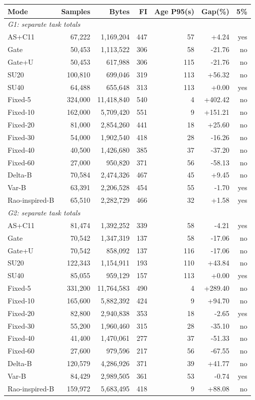 \begingroup\small\setlength{\tabcolsep}{4pt}\renewcommand{\arraystretch}{1.1}\begin{tabular}{lrrrrrr}\toprule
Mode & Samples & Bytes & FI & Age P95(s) & Gap(\%) & 5\% \\\midrule
\multicolumn{7}{l}{\textit{G1: separate task totals}} \\
AS+C11 & 67,222 & 1,169,204 & 447 & 57 & +4.24 & yes \\
Gate & 50,453 & 1,113,522 & 306 & 58 & -21.76 & no \\
Gate+U & 50,453 & 617,988 & 306 & 115 & -21.76 & no \\
SU20 & 100,810 & 699,046 & 319 & 113 & +56.32 & no \\
SU40 & 64,488 & 655,648 & 313 & 113 & +0.00 & yes \\
Fixed-5 & 324,000 & 11,418,840 & 540 & 4 & +402.42 & no \\
Fixed-10 & 162,000 & 5,709,420 & 551 & 9 & +151.21 & no \\
Fixed-20 & 81,000 & 2,854,260 & 441 & 18 & +25.60 & no \\
Fixed-30 & 54,000 & 1,902,540 & 418 & 28 & -16.26 & no \\
Fixed-40 & 40,500 & 1,426,680 & 385 & 37 & -37.20 & no \\
Fixed-60 & 27,000 & 950,820 & 371 & 56 & -58.13 & no \\
Delta-B & 70,584 & 2,474,326 & 467 & 45 & +9.45 & no \\
Var-B & 63,391 & 2,206,528 & 454 & 55 & -1.70 & yes \\
Rao-inspired-B & 65,510 & 2,282,729 & 466 & 32 & +1.58 & yes \\
\multicolumn{7}{l}{\textit{G2: separate task totals}} \\
AS+C11 & 81,474 & 1,392,252 & 339 & 58 & -4.21 & yes \\
Gate & 70,542 & 1,347,319 & 137 & 58 & -17.06 & no \\
Gate+U & 70,542 & 858,092 & 137 & 116 & -17.06 & no \\
SU20 & 122,343 & 1,154,911 & 193 & 110 & +43.84 & no \\
SU40 & 85,055 & 959,129 & 157 & 113 & +0.00 & yes \\
Fixed-5 & 331,200 & 11,764,583 & 490 & 4 & +289.40 & no \\
Fixed-10 & 165,600 & 5,882,392 & 424 & 9 & +94.70 & no \\
Fixed-20 & 82,800 & 2,940,838 & 353 & 18 & -2.65 & yes \\
Fixed-30 & 55,200 & 1,960,460 & 315 & 28 & -35.10 & no \\
Fixed-40 & 41,400 & 1,470,061 & 277 & 37 & -51.33 & no \\
Fixed-60 & 27,600 & 979,596 & 217 & 56 & -67.55 & no \\
Delta-B & 120,579 & 4,286,926 & 371 & 39 & +41.77 & no \\
Var-B & 84,429 & 2,989,505 & 361 & 53 & -0.74 & yes \\
Rao-inspired-B & 159,972 & 5,683,495 & 418 & 9 & +88.08 & no \\
\bottomrule\end{tabular}\endgroup
